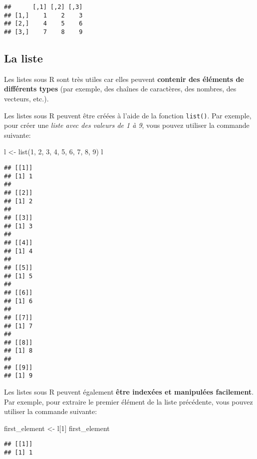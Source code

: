\documentclass[
]{article}
\newenvironment{Shaded}{\begin{snugshade}}{\end{snugshade}}
\newcommand{\DecValTok}[1]{\textcolor[rgb]{0.00,0.00,0.81}{#1}}
\newcommand{\FunctionTok}[1]{\textcolor[rgb]{0.00,0.00,0.00}{#1}}
\newcommand{\NormalTok}[1]{#1}
\newcommand{\OtherTok}[1]{\textcolor[rgb]{0.56,0.35,0.01}{#1}}
\begin{document}
\begin{verbatim}
##      [,1] [,2] [,3]
## [1,]    1    2    3
## [2,]    4    5    6
## [3,]    7    8    9
\end{verbatim}

\hypertarget{la-liste}{%
\subsection{La liste}\label{la-liste}}

Les listes sous R sont très utiles car elles peuvent \textbf{contenir des éléments de différents types} (par exemple, des chaînes de caractères, des nombres, des vecteurs, etc.).

Les listes sous R peuvent être créées à l'aide de la fonction \texttt{list()}. Par exemple, pour créer une \emph{liste avec des valeurs de 1 à 9}, vous pouvez utiliser la commande suivante:

\begin{Shaded}
\begin{Highlighting}[]
\NormalTok{l }\OtherTok{\textless{}{-}} \FunctionTok{list}\NormalTok{(}\DecValTok{1}\NormalTok{, }\DecValTok{2}\NormalTok{, }\DecValTok{3}\NormalTok{, }\DecValTok{4}\NormalTok{, }\DecValTok{5}\NormalTok{, }\DecValTok{6}\NormalTok{, }\DecValTok{7}\NormalTok{, }\DecValTok{8}\NormalTok{, }\DecValTok{9}\NormalTok{)}
\NormalTok{l}
\end{Highlighting}
\end{Shaded}

\begin{verbatim}
## [[1]]
## [1] 1
## 
## [[2]]
## [1] 2
## 
## [[3]]
## [1] 3
## 
## [[4]]
## [1] 4
## 
## [[5]]
## [1] 5
## 
## [[6]]
## [1] 6
## 
## [[7]]
## [1] 7
## 
## [[8]]
## [1] 8
## 
## [[9]]
## [1] 9
\end{verbatim}

Les listes sous R peuvent également \textbf{être indexées et manipulées facilement}. Par exemple, pour extraire le premier élément de la liste précédente, vous pouvez utiliser la commande suivante:

\begin{Shaded}
\begin{Highlighting}[]
\NormalTok{first\_element }\OtherTok{\textless{}{-}}\NormalTok{ l[}\DecValTok{1}\NormalTok{]}
\NormalTok{first\_element}
\end{Highlighting}
\end{Shaded}

\begin{verbatim}
## [[1]]
## [1] 1
\end{verbatim}
\end{document}
